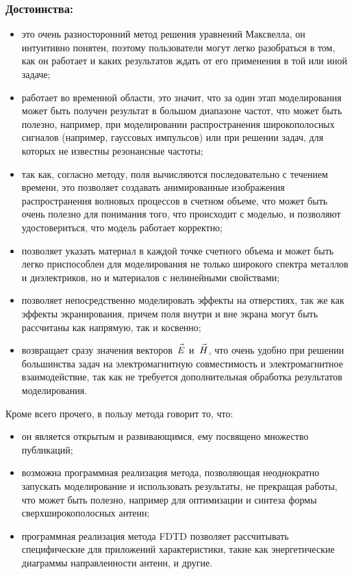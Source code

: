 \subsubsection*{Достоинства:}
\begin{itemize}

\item
это очень разносторонний метод решения уравнений Максвелла, он
интуитивно понятен, поэтому пользователи могут легко разобраться в том, как он
работает и каких результатов ждать от его применения в той или иной задаче;

\item
работает во временной области, это значит, что за один этап моделирования
может быть получен результат в большом диапазоне частот, что может быть полезно,
например, при моделировании распространения широкополосных сигналов (например,
гауссовых импульсов) или при решении задач, для которых не известны резонансные
частоты;

\item
так как, согласно методу, поля вычисляются последовательно с течением времени,
это позволяет создавать анимированные изображения распространения волновых
процессов в счетном объеме, что может быть очень полезно для
понимания того, что происходит с моделью, и позволяют удостовериться, что модель
работает корректно;

\item
позволяет указать материал в каждой точке счетного объема и может быть
легко приспособлен для моделирования не только широкого спектра металлов и
диэлектриков, но и материалов с нелинейными свойствами;

\item
позволяет непосредственно моделировать эффекты на отверстиях, так же как
эффекты экранирования, причем поля внутри и вне экрана могут быть рассчитаны как
напрямую, так и косвенно;

\item
возвращает сразу значения векторов~$\vec{E\mathstrut}$ и~$\vec{H\mathstrut}$, что
очень удобно при решении большинства задач на электромагнитную совместимость
и электромагнитное взаимодействие, так как не требуется дополнительная обработка
результатов моделирования.
\end{itemize}
Кроме всего прочего, в пользу метода говорит то, что:
\begin{itemize}

\item
он является открытым и развивающимся, ему посвящено множество публикаций;

\item
возможна программная реализация метода, позволяющая неоднократно запускать
моделирование и использовать результаты, не прекращая работы, что может быть
полезно, например для оптимизации и синтеза формы сверхширокополосных антенн;

\item
программная реализация метода FDTD позволяет рассчитывать специфические для
приложений характеристики, такие как энергетические диаграммы направленности
антенн, и другие.
\end{itemize}

